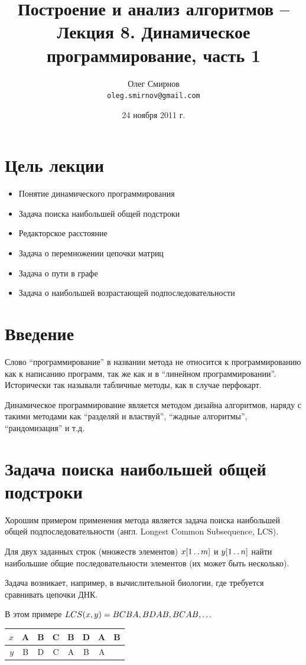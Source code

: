 \documentclass[a4paper,11pt]{article}
\author{Олег Смирнов\\
\texttt{oleg.smirnov@gmail.com}}
\date{24 ноября 2011 г.}
\title{Построение и анализ алгоритмов -- Лекция 8. Динамическое
программирование, часть 1}
\begin{document}
\maketitle
\tableofcontents
\newpage

\setlength{\parskip}{1ex plus 0.5ex minus 0.2ex}

\section*{Цель лекции}
\begin{itemize}
\item Понятие динамического программирования
\item Задача поиска наибольшей общей подстроки
\item Редакторское расстояние
\item Задача о перемножении цепочки матриц
\item Задача о пути в графе
\item Задача о наибольшей возрастающей подпоследовательности
\end{itemize}

\section{Введение}
Слово ``программирование'' в названии метода не относится к программированию как
к написанию программ, так же как и в ``линейном программировании''. Исторически
так называли табличные методы, как в случае перфокарт.

Динамическое программирование является методом дизайна алгоритмов, наряду с такими
методами как ``разделяй и властвуй'', ``жадные алгоритмы'', ``рандомизация'' и т.д.

\section{Задача поиска наибольшей общей подстроки}
Хорошим примером применения метода является задача поиска наибольшей общей
подпоследовательности (англ. Longest Common Subsequence, LCS).

Для двух заданных строк (множеств элементов) $x[1 \mathinner{\ldotp\ldotp} m]$ и $y[1 \mathinner{\ldotp\ldotp} n]$
найти наибольшие общие последовательности элементов (их может быть несколько).

Задача возникает, например, в вычислительной биологии, где требуется сравнивать
цепочки ДНК.

В этом примере $LCS(x, y) = BCBA, BDAB, BCAB, \mathinner{\ldotp\ldotp}$.
\begin{center}
\begin{tabular}{|r|c|c|c|c|c|c|c|}
  \hline
     $x$ & A & B & C & B & D & A & B \\
  \hline
     $y$ & B & D & C & A & B & A &   \\
  \hline
\end{tabular}
\end{center}
\end{document}
